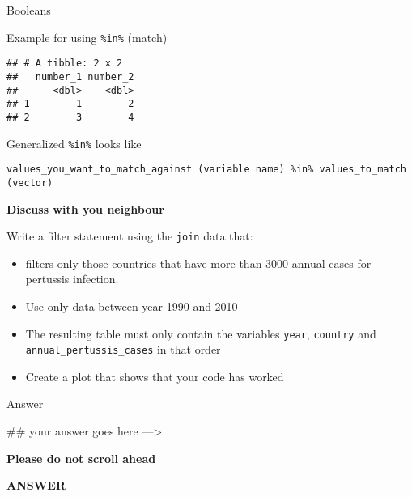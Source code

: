 \documentclass[ignorenonframetext,]{beamer}
\newenvironment{Shaded}{\begin{snugshade}}{\end{snugshade}}
\newcommand{\NormalTok}[1]{#1}
\providecommand{\tightlist}{%
  \setlength{\itemsep}{0pt}\setlength{\parskip}{0pt}}
\begin{document}
\begin{frame}[fragile]{Booleans}
\begin{block}{Example for using \texttt{\%in\%} (match)}
\begin{verbatim}
## # A tibble: 2 x 2
##   number_1 number_2
##      <dbl>    <dbl>
## 1        1        2
## 2        3        4
\end{verbatim}

\end{block}

\begin{block}{Generalized \texttt{\%in\%} looks like}

\begin{verbatim}
values_you_want_to_match_against (variable name) %in% values_to_match (vector)
\end{verbatim}

\end{block}

\begin{block}{\textbf{Discuss with you neighbour}}

Write a filter statement using the \texttt{join} data that:

\begin{itemize}
\tightlist
\item
  filters only those countries that have more than 3000 annual cases for
  pertussis infection.
\item
  Use only data between year 1990 and 2010
\item
  The resulting table must only contain the variables \texttt{year},
  \texttt{country} and \texttt{annual\_pertussis\_cases} in that order
\item
  Create a plot that shows that your code has worked
\end{itemize}

\end{block}

\begin{block}{Answer}

\begin{Shaded}
\begin{Highlighting}[]
\NormalTok{## your answer goes here --->}
\end{Highlighting}
\end{Shaded}

\textbf{Please do not scroll ahead}

\end{block}

\begin{block}{\textbf{ANSWER}}


\end{block}
\end{frame}
\end{document}
